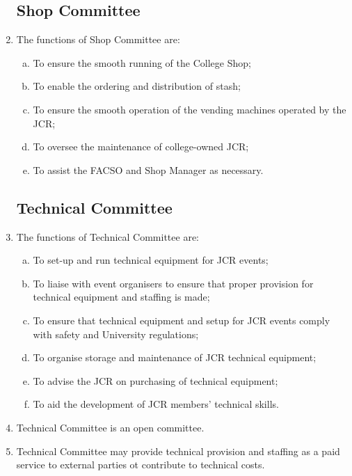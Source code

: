 \documentclass[12pt]{article}
\begin{document}
\begin{enumerate}
    \subsection{Shop Committee}
    \item The functions of Shop Committee are:
    \begin{enumerate}[(a)]
        \item To ensure the smooth running of the College Shop;
        \item To enable the ordering and distribution of stash;
        \item To ensure the smooth operation of the vending machines operated by the JCR;
        \item To oversee the maintenance of college-owned JCR;
        \item To assist the FACSO and Shop Manager as necessary.
    \end{enumerate}
    \subsection{Technical Committee}
    \item The functions of Technical Committee are:
    \begin{enumerate}[(a)]
        \item To set-up and run technical equipment for JCR events;
        \item To liaise with event organisers to ensure that proper provision for technical equipment and staffing is made;
        \item To ensure that technical equipment and setup for JCR events comply with safety and University regulations;
        \item To organise storage and maintenance of JCR technical equipment;
        \item To advise the JCR on purchasing of technical equipment;
        \item To aid the development of JCR members' technical skills.
    \end{enumerate}
    \item Technical Committee is an open committee.
    \item Technical Committee may provide technical provision and staffing as a paid service to external parties ot contribute to technical costs.

\end{enumerate}
\end{document}
